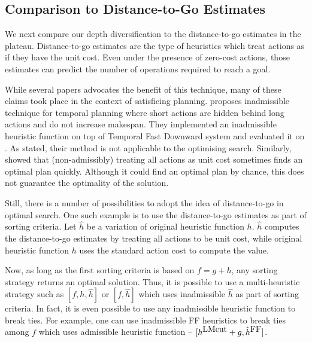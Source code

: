 


\subsection{Comparison to Distance-to-Go Estimates}

We next compare our depth diversification to the distance-to-go
estimates in the plateau.  Distance-to-go estimates are the type of
heuristics which treat actions as if they have the unit cost. Even under
the presence of zero-cost actions, those estimates can predict the
number of operations required to reach a goal.

While several papers advocates the benefit of this technique, many of
these claims took place in the context of satisficing planning.
\cite{benton2010g} proposes inadmissible technique for temporal planning
where short actions are hidden behind long actions and do not increase makespan.
They implemented an inadmissible heuristic function on top of Temporal Fast
Downward system and evaluated it on \astar.
As stated, their method is not applicable to the optimising search.
Similarly, \cite{cushing2010cost,wilt2011cost} showed that (non-admissibly) treating all
actions as unit cost sometimes finds an optimal plan quickly. Although
it could find an optimal plan by chance, this does not guarantee the
optimality of the solution.

Still, there is a number of possibilities to adopt the idea of
distance-to-go in optimal search. One such example is to use the
distance-to-go estimates as part of sorting criteria.
% 
Let $\hat{h}$ be a variation of original heuristic function
$h$. $\hat{h}$ computes the distance-to-go estimates by treating all
actions to be unit cost, while original heuristic function $h$ uses the
standard action cost to compute the value.

Now, as long as the first sorting criteria is based on $f=g+h$, any
sorting strategy returns an optimal solution. Thus, it is possible to
use a multi-heuristic strategy such as $[f,h,\hat{h}]$ or $[f,\hat{h}]$
which uses inadmissible $\hat{h}$ as part of sorting criteria.
In fact, it is even possible to use any inadmissible heuristic function to break
ties. For example, one can use inadmissible FF heuristics to break ties
among $f$ which uses admissible \lmcut heuristic function -- $[h^{\mbox{LMcut}}+g,\hat{h}^{\mbox{FF}}]$.

